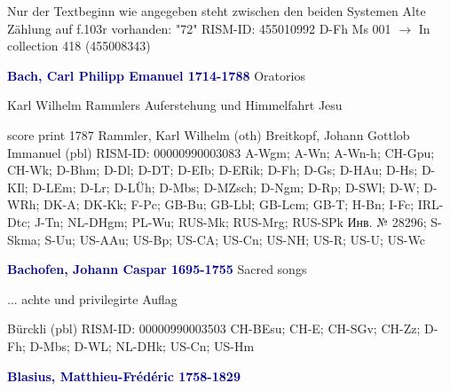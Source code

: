 \documentclass[twocolumn]{book}
\begin{document}
\newline Nur der Textbeginn wie angegeben steht zwischen den beiden Systemen
\newline Alte Zählung auf f.103r vorhanden: "72"
\newline RISM-ID: 455010992
\newline D-Fh  Ms 001
\newline $\rightarrow$ In collection 418 (455008343)
      
\newline \par \vspace{7pt} \textcolor{darkblue}{\textbf{Bach, Carl Philipp Emanuel  1714-1788}}
\newline Oratorios
\newline \begin{itshape}Karl Wilhelm Rammlers Auferstehung und Himmelfahrt Jesu\end{itshape} 
\newline \textcolor{darkblue}{}  score
\newline print  1787
\newline Rammler, Karl Wilhelm  (oth)
\newline Breitkopf, Johann Gottlob Immanuel  (pbl)
\newline RISM-ID: 00000990003083
\newline A-Wgm; A-Wn; A-Wn-h; CH-Gpu; CH-Wk; D-Bhm; D-Dl; D-DT; D-EIb; D-ERik; D-Fh; D-Gs; D-HAu; D-Hs; D-KIl; D-LEm; D-Lr; D-LÜh; D-Mbs; D-MZsch; D-Ngm; D-Rp; D-SWl; D-W; D-WRh; DK-A; DK-Kk; F-Pc; GB-Bu; GB-Lbl; GB-Lcm; GB-T; H-Bn; I-Fc; IRL-Dtc; J-Tn; NL-DHgm; PL-Wu; RUS-Mk; RUS-Mrg; RUS-SPk  Инв. № 28296; S-Skma; S-Uu; US-AAu; US-Bp; US-CA; US-Cn; US-NH; US-R; US-U; US-Wc
\newline \par \vspace{7pt} \textcolor{darkblue}{\textbf{Bachofen, Johann Caspar  1695-1755}}
\newline Sacred songs
\newline \begin{itshape}... achte und privilegirte Auflag\end{itshape} 
\newline Bürckli  (pbl)
\newline RISM-ID: 00000990003503
\newline CH-BEsu; CH-E; CH-SGv; CH-Zz; D-Fh; D-Mbs; D-WL; NL-DHk; US-Cn; US-Hm
\newline \par \vspace{7pt} \textcolor{darkblue}{\textbf{Blasius, Matthieu-Frédéric  1758-1829}}
\end{document}
